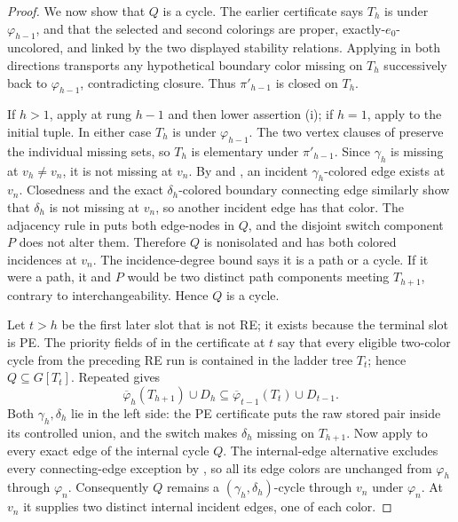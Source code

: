 \begin{proof}
We now show that \(Q\) is a cycle.  The earlier certificate says \(T_h\) is
 under \(\varphi_{h-1}\), and that the
selected and second colorings are proper, exactly-\(e_0\)-uncolored, and
linked by the two displayed stability relations.  Applying
 in both directions transports any hypothetical boundary color
missing on \(T_h\) successively back to \(\varphi_{h-1}\), contradicting
closure.  Thus \(\pi'_{h-1}\) is closed on \(T_h\).

If \(h>1\), apply  at rung \(h-1\) and
then lower assertion (i); if \(h=1\), apply
 to the initial tuple.  In either case
\(T_h\) is  under
\(\varphi_{h-1}\).  The two vertex clauses of
 preserve the individual missing sets, so \(T_h\)
is elementary under \(\pi'_{h-1}\).  Since \(\gamma_h\) is missing at
\(v_h\ne v_n\), it is not missing at \(v_n\).  By
 and , an incident
\(\gamma_h\)-colored edge exists at \(v_n\).  Closedness and the exact
\(\delta_h\)-colored boundary connecting edge similarly show that
\(\delta_h\) is not missing at \(v_n\), so another incident edge has that
color.  The adjacency rule in  puts both
edge-nodes in \(Q\), and the disjoint switch component \(P\) does not alter
them.  Therefore \(Q\) is nonisolated and has both colored incidences at
\(v_n\).  The incidence-degree bound says it is a path or a cycle.  If it
were a path, it and \(P\) would be two distinct path components meeting
\(T_{h+1}\), contrary to interchangeability.  Hence \(Q\) is a cycle.

Let \(t>h\) be the first later slot that is not RE; it exists because the
terminal slot is PE.  The priority fields of
 in the certificate at \(t\) say that every
eligible two-color cycle from the preceding RE run is contained in the
ladder tree \(T_t\); hence \(Q\subseteq G[T_t]\).  Repeated
 gives
\[
 \overline\varphi_h(T_{h+1})\cup D_h
 \subseteq \overline\varphi_{t-1}(T_t)\cup D_{t-1}.             \tag{2}
\]
Both \(\gamma_h,\delta_h\) lie in the left side: the PE certificate puts
the raw stored pair inside its controlled union, and the switch makes
\(\delta_h\) missing on \(T_{h+1}\).  Now apply
 to every exact edge of the internal cycle
\(Q\).  The internal-edge alternative excludes every connecting-edge
exception by , so all its edge colors are unchanged from \(\varphi_h\) through
\(\varphi_n\).  Consequently \(Q\) remains a
\((\gamma_h,\delta_h)\)-cycle through \(v_n\) under \(\varphi_n\).  At
\(v_n\) it supplies two distinct internal incident edges, one of each color.


\end{proof}
